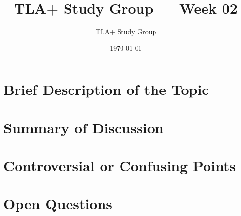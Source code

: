 \documentclass[11pt]{article}
\title{TLA+ Study Group — Week 02}
\author{TLA+ Study Group}
\date{\today}
\begin{document}
\maketitle

\section*{Brief Description of the Topic}

\section*{Summary of Discussion}

\section*{Controversial or Confusing Points}

\section*{Open Questions}
\end{document}
